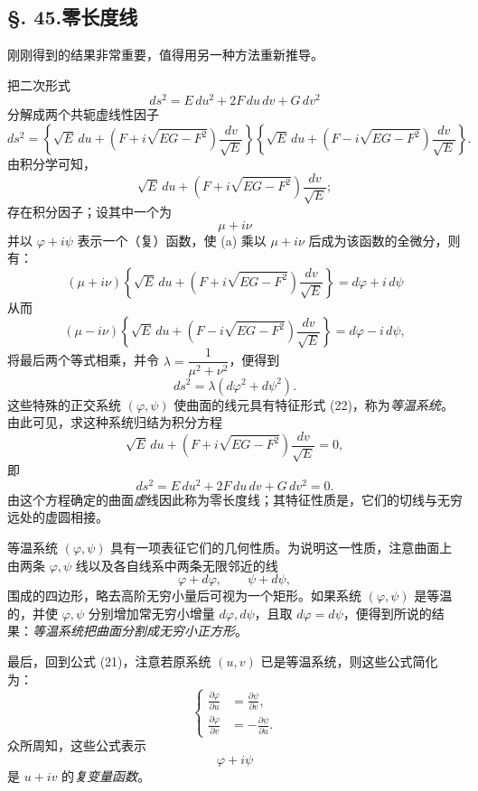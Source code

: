 \subsection*{\S. 45.\quad 零长度线}

刚刚得到的结果非常重要，值得用另一种方法重新推导。

把二次形式
\[
 ds^2=E\,du^2+2F\,du\,dv+G\,dv^2
\]
分解成两个共轭虚线性因子
\[
 ds^2=\left\{\sqrt E\,du+(F+i\sqrt{EG-F^2})\frac{dv}{\sqrt E}\right\}
\left\{\sqrt E\,du+(F-i\sqrt{EG-F^2})\frac{dv}{\sqrt E}\right\}.
\]
由积分学可知，
\begin{equation}\tag{a}
 \sqrt E\,du+(F+i\sqrt{EG-F^2})\frac{dv}{\sqrt E};
\end{equation}
存在积分因子；设其中一个为
\[
 \mu+i\nu
\]
并以 \(\varphi+i\psi\) 表示一个（复）函数，使 (a) 乘以 \(\mu+i\nu\) 后成为该函数的全微分，则有：
\[
(\mu+i\nu)\left\{\sqrt E\,du+(F+i\sqrt{EG-F^2})\frac{dv}{\sqrt E}\right\}=d\varphi+i\,d\psi
\]
从而
\[
(\mu-i\nu)\left\{\sqrt E\,du+(F-i\sqrt{EG-F^2})\frac{dv}{\sqrt E}\right\}=d\varphi-i\,d\psi,
\]
将最后两个等式相乘，并令 \(\lambda=\dfrac{1}{\mu^2+\nu^2}\)，便得到
\begin{equation}\tag{22}
 ds^2=\lambda(d\varphi^2+d\psi^2).
\end{equation}
这些特殊的正交系统 \((\varphi,\psi)\) 使曲面的线元具有特征形式 (22)，称为\emph{等温系统}。由此可见，求这种系统归结为积分方程
\[
 \sqrt E\,du+(F+i\sqrt{EG-F^2})\frac{dv}{\sqrt E}=0,
\]
即
\[
 ds^2=E\,du^2+2F\,du\,dv+G\,dv^2=0.
\]
由这个方程确定的曲面\emph{虚}线因此称为零长度线；其特征性质是，它们的切线与无穷远处的虚圆相接。

等温系统 \((\varphi,\psi)\) 具有一项表征它们的几何性质。为说明这一性质，注意曲面上由两条 \(\varphi,\psi\) 线以及各自线系中两条无限邻近的线
\[
 \varphi+d\varphi,
 \qquad
 \psi+d\psi,
\]
围成的四边形，略去高阶无穷小量后可视为一个矩形。如果系统 \((\varphi,\psi)\) 是等温的，并使 \(\varphi,\psi\) 分别增加常无穷小增量 \(d\varphi,d\psi\)，且取 \(d\varphi=d\psi\)，便得到所说的结果：\emph{等温系统把曲面分割成无穷小正方形}。

最后，回到公式 (21)，注意若原系统 \((u,v)\) 已是等温系统，则这些公式简化为：
\[
\left\{
\begin{aligned}
\frac{\partial\varphi}{\partial u}&=\frac{\partial\psi}{\partial v},\\[0.4em]
\frac{\partial\varphi}{\partial v}&=-\frac{\partial\psi}{\partial u}.
\end{aligned}
\right.
\]
众所周知，这些公式表示
\[
 \varphi+i\psi
\]
是 \(u+iv\) 的\emph{复变量函数}。

